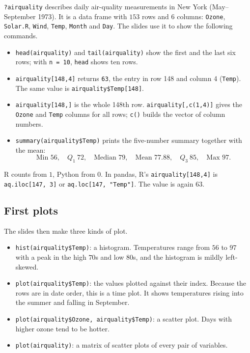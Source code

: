 \begin{example}\label{ex:L01-airquality}
\texttt{?airquality} describes daily air-quality measurements in New York (May--September 1973).
It is a data frame with $153$ rows and $6$ columns: \texttt{Ozone}, \texttt{Solar.R}, \texttt{Wind},
\texttt{Temp}, \texttt{Month} and \texttt{Day}. The slides use it to show the following commands.
\begin{itemize}
  \item \texttt{head(airquality)} and \texttt{tail(airquality)} show the first and the last six rows; with \texttt{n = 10}, \texttt{head} shows ten rows.
  \item \texttt{airquality[148,4]} returns \texttt{63}, the entry in row 148 and column 4 (\texttt{Temp}). The same value is \texttt{airquality\$Temp[148]}.
  \item \texttt{airquality[148,]} is the whole 148th row. \texttt{airquality[,c(1,4)]} gives the \texttt{Ozone} and \texttt{Temp} columns for all rows; \texttt{c()} builds the vector of column numbers.
  \item \texttt{summary(airquality\$Temp)} prints the five-number summary together with the mean:
  \[
  \text{Min }56,\quad Q_1\ 72,\quad \text{Median }79,\quad \text{Mean }77.88,\quad Q_3\ 85,\quad \text{Max }97.
  \]
\end{itemize}
\end{example}

\begin{note}
R counts from $1$, Python from $0$. In pandas, R's \texttt{airquality[148,4]} is
\texttt{aq.iloc[147, 3]} or \texttt{aq.loc[147, "Temp"]}. The value is again $63$.
\end{note}

\subsection{First plots}
The slides then make three kinds of plot.
\begin{itemize}
  \item \texttt{hist(airquality\$Temp)}: a histogram. Temperatures range from $56$ to $97$ with a peak in the high $70$s and low $80$s, and the histogram is mildly left-skewed.
  \item \texttt{plot(airquality\$Temp)}: the values plotted against their index. Because the rows are in date order, this is a time plot. It shows temperatures rising into the summer and falling in September.
  \item \texttt{plot(airquality\$Ozone, airquality\$Temp)}: a scatter plot. Days with higher ozone tend to be hotter.
  \item \texttt{plot(airquality)}: a matrix of scatter plots of every pair of variables.
\end{itemize}

